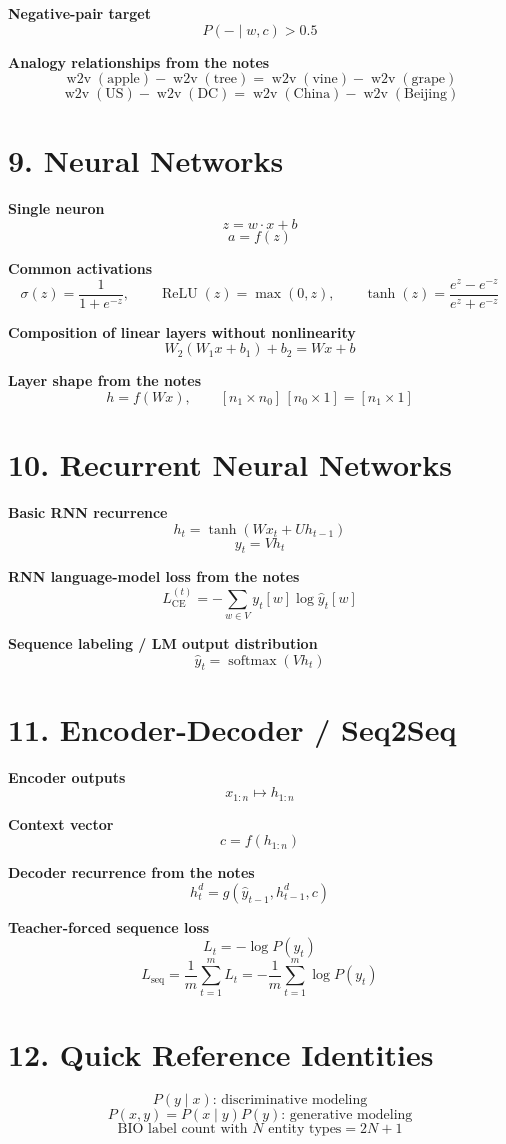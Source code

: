 \documentclass[11pt]{article}
\begin{document}
\textbf{Negative-pair target}
\[
P(- \mid w, c) > 0.5
\]

\textbf{Analogy relationships from the notes}
\[
\operatorname{w2v}(\text{apple}) - \operatorname{w2v}(\text{tree})
=
\operatorname{w2v}(\text{vine}) - \operatorname{w2v}(\text{grape})
\]
\[
\operatorname{w2v}(\text{US}) - \operatorname{w2v}(\text{DC})
=
\operatorname{w2v}(\text{China}) - \operatorname{w2v}(\text{Beijing})
\]

\section*{9. Neural Networks}

\textbf{Single neuron}
\[
z = w \cdot x + b
\]
\[
a = f(z)
\]

\textbf{Common activations}
\[
\sigma(z) = \frac{1}{1+e^{-z}}, \qquad
\operatorname{ReLU}(z) = \max(0, z), \qquad
\tanh(z) = \frac{e^z - e^{-z}}{e^z + e^{-z}}
\]

\textbf{Composition of linear layers without nonlinearity}
\[
W_2(W_1x + b_1) + b_2 = Wx + b
\]

\textbf{Layer shape from the notes}
\[
h = f(Wx), \qquad
[n_1 \times n_0]\,[n_0 \times 1] = [n_1 \times 1]
\]

\section*{10. Recurrent Neural Networks}

\textbf{Basic RNN recurrence}
\[
h_t = \tanh(Wx_t + Uh_{t-1})
\]
\[
y_t = Vh_t
\]

\textbf{RNN language-model loss from the notes}
\[
L_{\text{CE}}^{(t)} = -\sum_{w \in V} y_t[w]\log \hat{y}_t[w]
\]

\textbf{Sequence labeling / LM output distribution}
\[
\hat{y}_t = \operatorname{softmax}(Vh_t)
\]

\section*{11. Encoder-Decoder / Seq2Seq}

\textbf{Encoder outputs}
\[
x_{1:n} \mapsto h_{1:n}
\]

\textbf{Context vector}
\[
c = f(h_{1:n})
\]

\textbf{Decoder recurrence from the notes}
\[
h_t^{d} = g(\hat{y}_{t-1}, h_{t-1}^{d}, c)
\]

\textbf{Teacher-forced sequence loss}
\[
L_t = -\log P(y_t)
\]
\[
L_{\text{seq}} = \frac{1}{m}\sum_{t=1}^{m} L_t
= -\frac{1}{m}\sum_{t=1}^{m}\log P(y_t)
\]

\section*{12. Quick Reference Identities}

\[
P(y \mid x) \text{: discriminative modeling}
\]
\[
P(x, y) = P(x \mid y)P(y) \text{: generative modeling}
\]
\[
\text{BIO label count with }N\text{ entity types} = 2N + 1
\]
\end{document}
